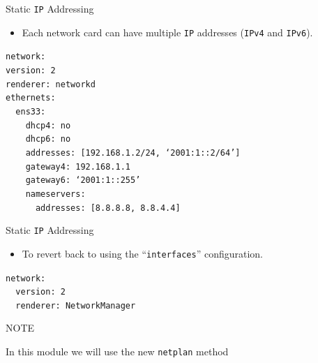 \documentclass[aspectratio=169]{beamer}
\begin{document}
\begin{frame}{Static \texttt{IP} Addressing}
  \begin{itemize}
    \item Each network card can have multiple \texttt{IP} addresses (\texttt{IPv4} and \texttt{IPv6}).
  \end{itemize}
  \begin{center}
    \begin{minipage}{9cm}
      \begin{block}{}
        \texttt{network:\\
        version: 2\\
        renderer: networkd\\
        ethernets:\\
        ~~ens33:\\
        ~~~~dhcp4: no\\
        ~~~~dhcp6: no\\
        ~~~~addresses: [192.168.1.2/24, `2001:1::2/64']\\
        ~~~~gateway4: 192.168.1.1\\
        ~~~~gateway6: `2001:1::255'\\
        ~~~~nameservers:\\
        ~~~~~~addresses: [8.8.8.8, 8.8.4.4]}
      \end{block}
    \end{minipage}
  \end{center}
\end{frame}

\begin{frame}{Static \texttt{IP} Addressing}
  \begin{itemize}
    \item To revert back to using the ``\texttt{interfaces}'' configuration.
  \end{itemize}
  \begin{center}
    \begin{minipage}{9cm}
      \begin{block}{}
        \texttt{network:\\
        ~~version: 2\\
        ~~renderer: NetworkManager\\}
      \end{block}
    \end{minipage}
  \end{center}
  \begin{block}{NOTE}
    \begin{center}
      In this module we will use the new \texttt{netplan} method      
    \end{center}
  \end{block}
\end{frame}
\end{document}
